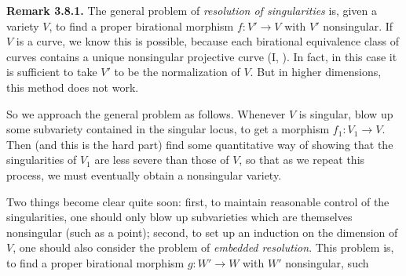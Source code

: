 {\medskip
\noindent\hypertarget{result-V-3.8.1}{}\textbf{Remark 3.8.1.} The general problem of \emph{resolution of singularities} is, given a variety $V$, to find a proper birational morphism $f\colon V'\to V$ with $V'$ nonsingular. If $V$ is a curve, we know this is possible, because each birational equivalence class of curves contains a unique nonsingular projective curve (I, ). In fact, in this case it is sufficient to take $V'$ to be the normalization of $V$. But in higher dimensions, this method does not work.

So we approach the general problem as follows. Whenever $V$ is singular, blow up some subvariety contained in the singular locus, to get a morphism $f_1\colon V_1\to V$. Then (and this is the hard part) find some quantitative way of showing that the singularities of $V_1$ are less severe than those of $V$, so that as we repeat this process, we must eventually obtain a nonsingular variety.

Two things become clear quite soon: first, to maintain reasonable control of the singularities, one should only blow up subvarieties which are themselves nonsingular (such as a point); second, to set up an induction on the dimension of $V$, one should also consider the problem of \emph{embedded resolution}. This problem is,  to find a proper birational morphism $g\colon W'\to W$ with $W'$ nonsingular, such
}

